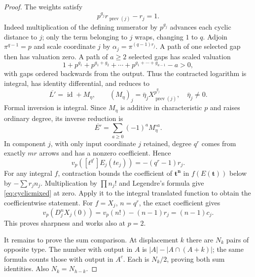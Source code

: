 \documentclass[11pt,a4paper]{article}
\theoremstyle{definition}\newtheorem{remark}[theorem]{Remark}
\newcommand{\vp}{v_p}\newcommand{\dR}{\mathrm{dR}}\newcommand{\crys}{\mathrm{crys}}
\newcommand{\id}{\operatorname{id}}\newcommand{\Hom}{\operatorname{Hom}}
\begin{document}
\begin{proof}
The weights satisfy
\begin{equation}\label{eq:cyclicedge}
 p^{g_j}r_{\operatorname{prev}(j)}-r_j=1.
\end{equation}
Indeed multiplication of the defining numerator by $p^{g_j}$ advances each cyclic distance to $j$; only the term belonging to $j$ wraps, changing $1$ to $q$. Adjoin $\pi^{q-1}=p$ and scale coordinate $j$ by $\alpha_j=\pi^{(q-1)r_j}$. A path of one selected gap then has valuation zero. A path of $a\ge2$ selected gaps has scaled valuation
\[
 1+p^{g_1}+p^{g_1+g_2}+\cdots+
       p^{g_1+\cdots+g_{a-1}}-a>0,
\]
with gaps ordered backwards from the output. Thus the contracted logarithm is integral, has identity differential, and reduces to
\[
 \overline{L'}=\id+M_\eta,\qquad
 (M_\eta)_j=\bar\eta_jX_{\operatorname{prev}(j)}^{p^{g_j}},
 \quad\bar\eta_j\ne0.
\]
Formal inversion is integral. Since $M_\eta$ is additive in characteristic $p$ and raises ordinary degree, its inverse reduction is
\[
 \overline{E'}=\sum_{a\ge0}(-1)^aM_\eta^{\circ a}.
\]
In component $j$, with only input coordinate $j$ retained, degree $q^r$ comes from exactly $mr$ arrows and has a nonzero coefficient. Hence
\[
 \vp([t^{q^r}]E_j(te_j))=-(q^r-1)r_j.
\]
For any integral $f$, contraction bounds the coefficient of $\mathbf t^{\mathbf n}$ in $f(E(\mathbf t))$ below by $-\sum r_jn_j$. Multiplication by $\prod n_j!$ and Legendre's formula give \eqref{eq:cyclicmixed} at zero. Apply it to the integral translated function to obtain the coefficientwise statement. For $f=X_j$, $n=q^r$, the exact coefficient gives
\[
 \vp(D_j^nX_j(0))=\vp(n!)-(n-1)r_j=(n-1)c_j.
\]
This proves sharpness and works also at $p=2$.

It remains to prove the sum comparison. At displacement $k$ there are $N_k$ pairs of opposite type. The number with output in $A$ is
$|A|-|A\cap(A+k)|$; the same formula counts those with output in $A^c$. Each is $N_k/2$, proving both sum identities. Also $N_k=N_{h-k}$.


\end{proof}
\end{document}
